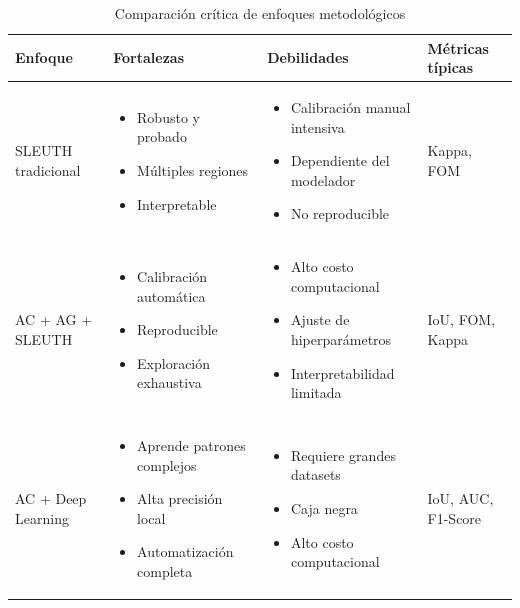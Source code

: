\begin{table}[h]
\centering
\caption{Comparación crítica de enfoques metodológicos}
\renewcommand{\arraystretch}{1.4}
\begin{tabular}{@{}p{3cm}p{4cm}p{4cm}p{3cm}@{}}
\toprule
\textbf{Enfoque} & \textbf{Fortalezas} & \textbf{Debilidades} & \textbf{Métricas típicas} \\
\midrule
SLEUTH tradicional & 
\begin{itemize}[leftmargin=*,nosep]
\item Robusto y probado
\item Múltiples regiones
\item Interpretable
\end{itemize} & 
\begin{itemize}[leftmargin=*,nosep]
\item Calibración manual intensiva
\item Dependiente del modelador
\item No reproducible
\end{itemize} & 
Kappa, FOM \\
\midrule
AC + AG + SLEUTH & 
\begin{itemize}[leftmargin=*,nosep]
\item Calibración automática
\item Reproducible
\item Exploración exhaustiva
\end{itemize} & 
\begin{itemize}[leftmargin=*,nosep]
\item Alto costo computacional
\item Ajuste de hiperparámetros
\item Interpretabilidad limitada
\end{itemize} & 
IoU, FOM, Kappa \\
\midrule
AC + Deep Learning & 
\begin{itemize}[leftmargin=*,nosep]
\item Aprende patrones complejos
\item Alta precisión local
\item Automatización completa
\end{itemize} & 
\begin{itemize}[leftmargin=*,nosep]
\item Requiere grandes datasets
\item Caja negra
\item Alto costo computacional
\end{itemize} & 
IoU, AUC, F1-Score \\
\bottomrule
\end{tabular}
\label{tab:methodological_comparison}
\end{table}

